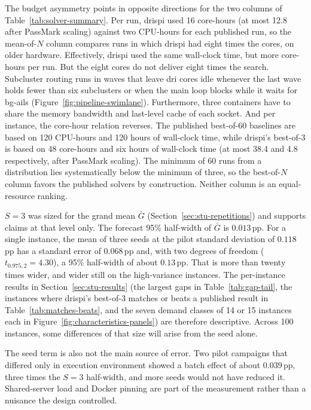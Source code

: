 The budget asymmetry points in opposite directions for the two columns of
Table~\ref{tab:solver-summary}. Per run, \gls{drispi} used 16 core-hours (at most
12.8 after PassMark scaling) against two CPU-hours for each published run, so
the mean-of-$N$ column compares runs in which \gls{drispi} had eight times the cores,
on older hardware. Effectively, \gls{drispi} used the same wall-clock time, but more core-hours per run.
But the eight cores do not deliver eight times the search. Subcluster routing runs in waves that leave \gls{dri} cores idle whenever the last wave holds fewer than six subclusters or when the main loop blocks while it waits for
\gls{bg-ails} (Figure~\ref{fig:pipeline-swimlane}). Furthermore, three containers have to share the memory
bandwidth and last-level cache of each socket. And per instance, the core-hour relation 
reverses. The published best-of-60 baselines are based on 120 CPU-hours and 120 hours of
wall-clock time, while \gls{drispi}'s best-of-3 is based on 48 core-hours and six hours of wall-clock time (at most 38.4 and 4.8 respectively, after PassMark scaling). The minimum of 60 runs from a distribution lies
systematically below the minimum of three, so the best-of-$N$ column favors the
published solvers by construction. Neither column is an equal-resource ranking.

$S = 3$ was sized for the grand mean $\bar{G}$
(Section~\ref{sec:stu-repetitions}) and supports claims at that level only.
The forecast 95\% half-width of $\bar{G}$ is $0.013$\,pp. For a single instance,
the mean of three seeds at the pilot standard deviation of $0.118$\,pp has a
standard error of $0.068$\,pp and, with two degrees of freedom
($t_{0.975,2} = 4.30$), a 95\% half-width of about $0.13$\,pp. That is more than
twenty times wider, and wider still on the high-variance instances. The
per-instance results in Section~\ref{sec:stu-results} (the largest gaps in
Table~\ref{tab:gap-tail}, the instances where \gls{drispi}'s best-of-3 matches or
beats a published result in Table~\ref{tab:matches-beats}, and the seven
demand classes of 14 or 15 instances each in
Figure~\ref{fig:characteristics-panels}) are therefore descriptive. Across 100 instances,
some differences of that size will arise from the seed alone.

The seed term is also not the main source of error. Two pilot campaigns that
differed only in execution environment showed a batch effect of about $0.039$\,pp,
three times the $S = 3$ half-width, and more seeds would not have reduced
it. Shared-server load and Docker pinning are part of the measurement rather
than a nuisance the design controlled.

